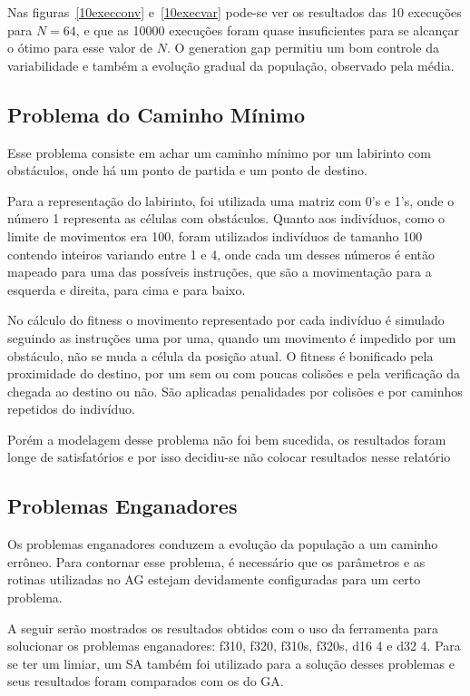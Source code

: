 \documentclass[12pt]{article}
\begin{document}
Nas figuras~\ref{10execconv} e~\ref{10execvar} pode-se ver os resultados das 10 execuções 
para $N = 64$, e que as 10000 execuções foram quase insuficientes para se alcançar o 
ótimo para esse valor de $N$. O generation gap permitiu um bom controle da variabilidade 
e também a evolução gradual da população, observado pela média.

\subsection{Problema do Caminho Mínimo}

Esse problema consiste em achar um caminho mínimo por um labirinto com obstáculos, onde 
há um ponto de partida e um ponto de destino.

Para a representação do labirinto, foi utilizada uma matriz com 0's e 1's, onde o número 
1 representa as células com obstáculos. Quanto aos indivíduos, como o limite de 
movimentos era 100, foram utilizados indivíduos de tamanho 100 contendo inteiros variando 
entre 1 e 4, onde cada um desses números é então mapeado para uma das possíveis instruções, 
que são a movimentação para a esquerda e direita, para cima e para baixo.

No cálculo do fitness o movimento representado por cada indivíduo é simulado seguindo as 
instruções uma por uma, quando um movimento é impedido por um obstáculo, não se muda a 
célula da posição atual. O fitness é bonificado pela proximidade do destino, por um 
sem ou com poucas colisões e pela verificação da chegada ao destino ou não. São aplicadas 
penalidades por colisões e por caminhos repetidos do indivíduo.

Porém a modelagem desse problema não foi bem sucedida, os resultados foram longe de 
satisfatórios e por isso decidiu-se não colocar resultados nesse relatório

\subsection{Problemas Enganadores}

Os problemas enganadores conduzem a evolução da população a um caminho errôneo. Para contornar
esse problema, é necessário que os parâmetros e as rotinas utilizadas no AG estejam devidamente 
configuradas para um certo problema. 

A seguir serão mostrados os resultados obtidos com o uso da ferramenta para solucionar os problemas 
enganadores: f310, f320, f310s, f320s, d16 4 e d32 4. Para se ter um limiar, um SA também foi 
utilizado para a solução desses problemas e seus resultados foram comparados com os do GA.
\end{document}
